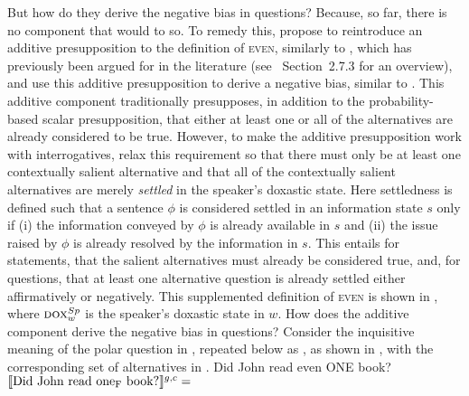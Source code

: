 But how do they derive the negative bias in questions? Because, so far, there is no component that would to so. To remedy this, \textcite{Jeong2021,Jeong2022} propose to reintroduce an additive presupposition to the definition of {\scshape even}, similarly to \textcite{Crnic2019}, which has previously been argued for in the literature (see \textcite[p.~110ff]{Guerzoni2003}~Section~2.7.3 for an overview), and use this additive presupposition to derive a negative bias, similar to \textcite{vanRooij2003}. This additive component traditionally presupposes, in addition to the probability-based scalar presupposition, that either at least one or all of the alternatives are already considered to be true. However, to make the additive presupposition work with interrogatives, \textcite{Jeong2021,Jeong2022} relax this requirement so that there must only be at least one contextually salient alternative and that all of the contextually salient alternatives are merely \textit{settled} in the speaker's doxastic state. Here settledness is defined such that a sentence $\phi$ is considered settled in an information state $s$ only if (i) the information conveyed by $\phi$ is already available in $s$ and (ii) the issue raised by $\phi$ is already resolved by the information in $s$. This entails for statements, that the salient alternatives must already be considered true, and, for questions, that at least one alternative question is already settled either affirmatively or negatively. This supplemented definition of {\scshape even} is shown in , where $\predicate{dox}^{Sp}_w$ is the speaker's doxastic state in $w$.
\ex{}
{}
\xe
How does the additive component derive the negative bias in questions? Consider the inquisitive meaning of the polar question in , repeated below as , as shown in , with the corresponding set of alternatives in .
\pex[nopreamble=true]%
\a{} Did John read even \MakeUppercase{one} book?
\a{} $\intension[g,c]{Did John read one\textsubscript{F} book?}=$
